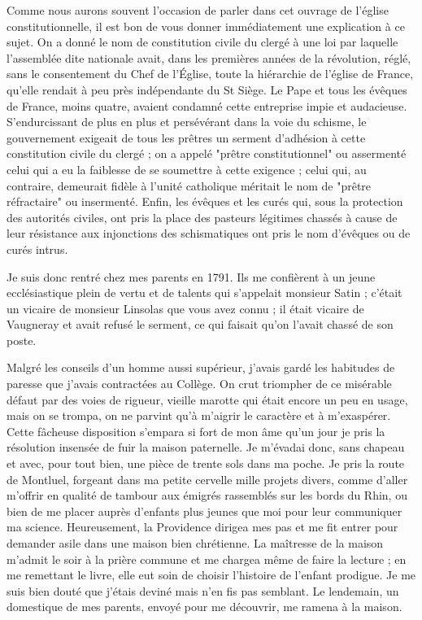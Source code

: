 \documentclass[11pt,a4paper]{report}
\begin{document}
Comme nous aurons souvent l'occasion de parler dans cet ouvrage de l'église constitutionnelle, il est bon de vous donner immédiatement une explication à ce sujet. On a donné le nom de constitution civile du clergé à une loi par laquelle l'assemblée dite nationale avait, dans les premières années de la révolution, réglé, sans le consentement du Chef de l'Église, toute la hiérarchie de l'église de France, qu'elle rendait à peu près indépendante du St Siège. Le Pape et tous les évêques de France, moins quatre, avaient condamné cette entreprise impie et audacieuse. S'endurcissant de plus en plus et persévérant dans la voie du schisme, le gouvernement exigeait de tous les prêtres un serment d'adhésion à cette constitution civile du clergé ; on a appelé "prêtre constitutionnel" ou assermenté celui qui a eu la faiblesse de se soumettre à cette exigence ; celui qui, au contraire, demeurait fidèle à l'unité catholique méritait le nom de "prêtre réfractaire" ou insermenté. Enfin, les évêques et les curés qui, sous la protection des autorités civiles, ont pris la place des pasteurs légitimes chassés à cause de leur résistance aux injonctions des schismatiques ont pris le nom d'évêques ou de curés intrus.

Je suis donc rentré chez mes parents en 1791. Ils me confièrent à un jeune ecclésiastique plein de vertu et de talents qui s'appelait monsieur Satin ; c'était un vicaire de monsieur Linsolas que vous avez connu ; il était vicaire de Vaugneray et avait refusé le serment, ce qui faisait qu'on l'avait chassé de son poste.

Malgré les conseils d'un homme aussi supérieur, j'avais gardé les habitudes de paresse que j'avais contractées au Collège. On crut triompher de ce misérable défaut par des voies de rigueur, vieille marotte qui était encore un peu en usage, mais on se trompa, on ne parvint qu'à m'aigrir le caractère et à m'exaspérer. Cette fâcheuse disposition s'empara si fort de mon âme qu'un jour je pris la résolution insensée de fuir la maison paternelle. Je m'évadai donc, sans chapeau et avec, pour tout bien, une pièce de trente sols dans ma poche. Je pris la route de Montluel, forgeant dans ma petite cervelle mille projets divers, comme d'aller m'offrir en qualité de tambour aux émigrés rassemblés sur les bords du Rhin, ou bien de me placer auprès d'enfants plus jeunes que moi pour leur communiquer ma science. Heureusement, la Providence dirigea mes pas et me fit entrer pour demander asile dans une maison bien chrétienne. La maîtresse de la maison m'admit le soir à la prière commune et me chargea même de faire la lecture ; en me remettant le livre, elle eut soin de choisir l'histoire de l'enfant prodigue. Je me suis bien douté que j'étais deviné mais n'en fis pas semblant. Le lendemain, un domestique de mes parents, envoyé pour me découvrir, me ramena à la maison.
\end{document}
